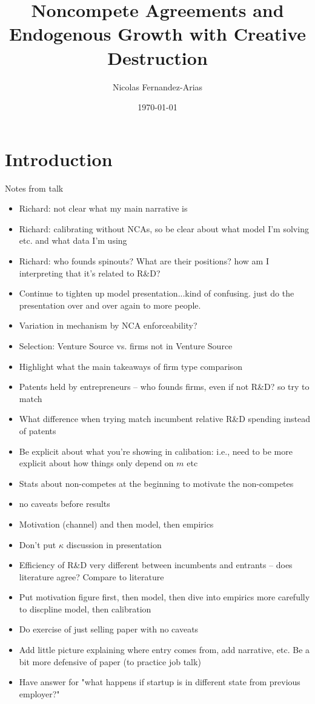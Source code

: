 \documentclass[english,usenames,dvipsnames]{beamer}
\title{Noncompete Agreements and Endogenous Growth with Creative Destruction}
\author{Nicolas Fernandez-Arias}
\date{\today }
\begin{document}
\maketitle

\section{Introduction}

\begin{frame}{Notes from talk}
\begin{itemize}
	\item Richard: not clear what my main narrative is
	\item Richard: calibrating without NCAs, so be clear about what model I'm solving etc. and what data I'm using 
	\item Richard: who founds spinouts? What are their positions? how am I interpreting that it's related to R\&D?
	\item Continue to tighten up model presentation...kind of confusing. just do the presentation over and over again to more people.
	\item Variation in mechanism by NCA enforceability? 
	\item Selection: Venture Source vs. firms not in Venture Source
	\item Highlight what the main takeaways of firm type comparison
	\item Patents held by entrepreneurs -- who founds firms, even if not R\&D? so try to match
	\item What difference when trying match incumbent relative R\&D spending instead of patents
	\item Be explicit about what you're showing in calibation: i.e., need to be more explicit about how things only depend on $m$ etc
	\item Stats about non-competes at the beginning to motivate the non-competes
	\item no caveats before results
	\item Motivation (channel) and then model, then empirics
	\item Don't put $\kappa$ discussion in presentation
	\item Efficiency of R\&D very different between incumbents and entrants -- does literature agree? Compare to literature
	\item Put motivation figure first, then model, then dive into empirics more carefully to discpline model, then calibration
	\item Do exercise of just selling paper with no caveats
	\item Add little picture explaining where entry comes from, add narrative, etc. Be a bit more defensive of paper (to practice job talk)
	\item Have answer for "what happens if startup is in different state from previous employer?"
\end{itemize}
\end{frame}
\end{document}

